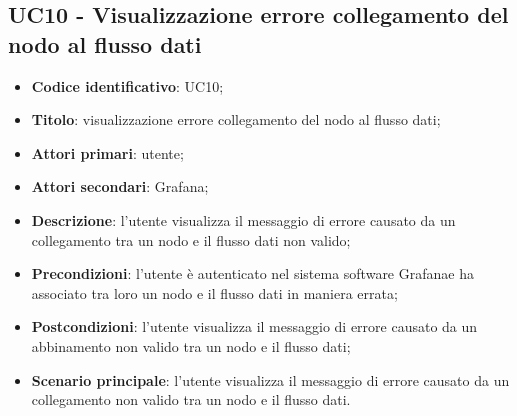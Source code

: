 \subsection{UC10 - Visualizzazione errore collegamento del nodo al flusso dati}
\begin{itemize}
    \item \textbf{Codice identificativo}: UC10;
    \item \textbf{Titolo}: visualizzazione errore collegamento del nodo al flusso dati;
    \item \textbf{Attori primari}: utente;
    \item \textbf{Attori secondari}: Grafana\glo;
    \item \textbf{Descrizione}: l'utente visualizza il messaggio di errore causato da un collegamento tra un nodo e il flusso dati non valido;
    \item \textbf{Precondizioni}: l'utente è autenticato nel sistema software Grafana\glosp e ha associato tra loro un nodo e il flusso dati in maniera errata;
    \item \textbf{Postcondizioni}: l'utente visualizza il messaggio di errore causato da un abbinamento non valido tra un nodo e il flusso dati;
    \item \textbf{Scenario principale}: l'utente visualizza il messaggio di errore causato da un collegamento non valido tra un nodo e il flusso dati.
\end{itemize}